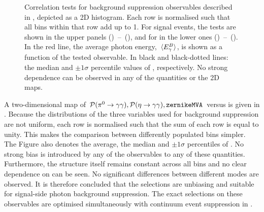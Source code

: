 \begin{figure}[hbtp!]
{    }
    \caption{\label{fig:selection_correlations} Correlation tests for background suppression observables described in , depicted as a 2D histogram.
    Each row is normalised such that all bins within that row add up to 1.
    For signal \BptoXsgamma events, the tests are shown
    in the upper panels \mbox{() -- ()},
    and for \BztoXsgamma in the lower ones \mbox{() -- ()}.
    In the red line, the average photon energy, $\expval**{{E^B_{\gamma}}}$, is shown as a function of the tested observable.
    In black and black-dotted lines: the median and $\pm 1 \sigma$ percentile values of \EB, respectively.
    No strong dependence can be observed in any of the quantities or the 2D maps.
    }
\end{figure}

A two-dimensional map of ${{\mathcal{P}(\pi^0\rightarrow\gamma\gamma)},{\mathcal{P}(\eta\rightarrow\gamma\gamma)},{\texttt{zernikeMVA}}}$ versus \EB is given in .
Because the distributions of the three variables used for background suppression are not uniform, each row is normalised such that the sum of each row is equal to unity.
This makes the comparison between differently populated bins simpler.
The Figure also denotes the average, the median and $\pm 1\sigma$ percentiles of \EB.
No strong bias is introduced by any of the observables to any of these quantities.
Furthermore, the structure itself remains constant across all bins and no clear dependence on \EB can be seen.
No significant differences between different \FEI modes are observed.
It is therefore concluded that the selections are unbiasing and suitable for signal-side photon background suppression.
The exact selections on these observables are optimised simultaneously with continuum event suppression in .